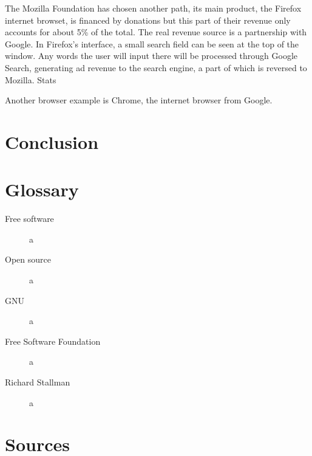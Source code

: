 \documentclass[12pt]{article}
\begin{document}
The Mozilla Foundation has chosen another path, its main product, the
Firefox internet browset, is financed by donations but this part of
their revenue only accounts for about 5\% of the total. The real
revenue source is a partnership with Google. In Firefox's interface, a
small search field can be seen at the top of the window. Any words the
user will input there will be processed through Google Search,
generating ad revenue to the search engine, a part of which is
reversed to Mozilla. Stats

Another browser example is Chrome, the internet browser from Google.

\section*{Conclusion}

\section*{Glossary}

\begin{description}
  \item[Free software]{a}
  \item[Open source]{a}
  \item[GNU]{a}
  \item[Free Software Foundation]{a}
  \item[Richard Stallman]{a}
\end{description}

\section*{Sources}



\end{document}
